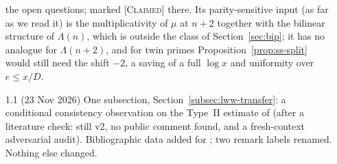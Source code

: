 \documentclass[11pt]{amsart}
\theoremstyle{definition}
\theoremstyle{remark}
\newcommand{\lbl}[1]{\textup{\textsc{[#1]}}}
\begin{document}
\begin{itemize}
  the open questions; marked \lbl{Claimed} there. Its parity-sensitive input
  (as far as we read it) is the multiplicativity of $\mu$ at $n+2$ together
  with the bilinear structure of $\Lambda(n)$, which is outside the class of
  Section~\ref{sec:bip}; it has no analogue for $\Lambda(n+2)$, and for
  twin primes Proposition~\ref{prop:ss-split} would still need the shift $-2$,
  a saving of a full $\log x$ and uniformity over $e\le x/D$.
\item[1.1] (23 Nov 2026) One subsection, Section~\ref{subsec:lww-transfer}: a
  conditional consistency observation on the Type~II estimate of \cite{LWW26}
  (after a literature check: \cite{LWW26} still v2, no public comment found, and
  a fresh-context adversarial audit). Bibliographic data added for
  \cite{MR16,GT10,GT12}; two remark labels renamed. Nothing else changed.
\end{itemize}
\end{document}
